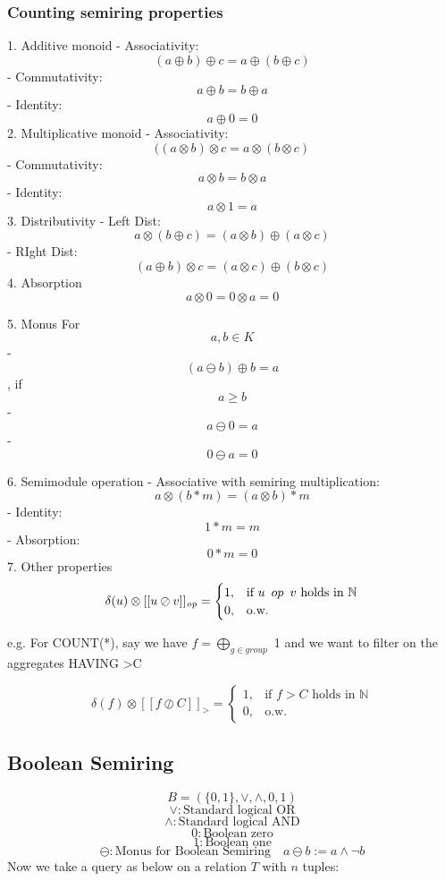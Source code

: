 \documentclass{article}
\begin{document}
\subsubsection{Counting semiring properties}
1. Additive monoid
- Associativity: $$(a \oplus b) \oplus c = a \oplus (b\oplus c)$$
- Commutativity: $$a \oplus b = b \oplus a$$
- Identity: $$a \oplus 0 = 0$$
2. Multiplicative monoid
- Associativity: $$( (a \otimes b) \otimes c = a \otimes (b\otimes c)$$
- Commutativity: $$a \otimes b = b \otimes a$$
- Identity: $$a \otimes 1 = a$$
3. Distributivity
- Left Dist: $$a \otimes (b \oplus c)= (a \otimes b)\oplus(a \otimes c)$$
- RIght Dist: $$(a \oplus b)\otimes c=(a \otimes c)\oplus(b \otimes c)$$
 4. Absorption
$$a \otimes 0 = 0 \otimes a = 0$$

5. Monus \newline
For $$a, b \in K$$
- $$(a \ominus b) \oplus b =a$$, if $$a \geq b$$
- $$a \ominus 0 =a$$
- $$0 \ominus a = 0$$

6. Semimodule operation
- Associative with semiring multiplication: $$a \otimes (b * m)= (a \otimes b) * m$$
- Identity: $$1*m=m$$
- Absorption: $$0*m=0$$
7. Other properties
$$
 \delta(u)\otimes[[u \oslash   v]]_{\mathit{op}}=\begin{cases}1, & \text{if } u\hspace{0.5em} op\hspace{0.5em} v \text{ holds in } \mathbb{N} \\
0,&\text{o.w.}\end{cases}
$$

e.g. For COUNT(*), say we have $f=\bigoplus_{g \in group}$ 1 and we want to filter on the aggregates HAVING >C

$$
 \delta(f)\otimes[[f \oslash   C]]_{\mathit{>}}=\begin{cases}1, & \text{if } f>C \text{ holds in } \mathbb{N} \\
0,&\text{o.w.}\end{cases}
$$

\subsection{Boolean Semiring}
$$B = (\{0,1\}, \lor, \land, 0, 1)$$
$$\lor : \text{Standard logical OR}$$
$$\land : \text{Standard logical AND}$$
$$0 : \text{Boolean zero}$$
$$1 : \text{Boolean one}$$
\[
\ominus: \text{Monus for Boolean Semiring} \quad a \ominus b := a \land \neg b
\]
Now we take a query as below on a relation $T$ with $n$ tuples:
\end{document}

